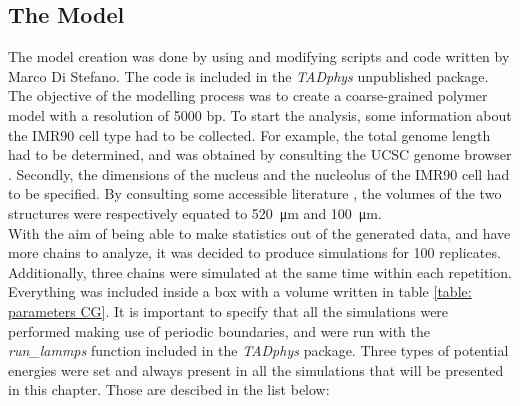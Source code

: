 
\subsection{The Model} \label{chap: the model description}
The model creation was done by using and modifying scripts and code written by Marco Di Stefano. The code is included in the \textit{TADphys} unpublished package.
The objective of the modelling process was to create a coarse-grained polymer model with a resolution of 5000 bp. To start the analysis, some information about the IMR90 cell type had to be collected. For example, the total genome length had to be determined, and was obtained by consulting the UCSC genome browser
\cite{UCSCGenomeBrowser}.
Secondly, the dimensions of the nucleus and the nucleolus of the IMR90 cell had to be specified. By consulting some accessible literature
\cite{ehlerHumanFoetalLung1996,ingramHiCImplementationGenome2020,maiserSuperresolutionSituAnalysis2020},
the volumes of the two structures were respectively equated to \SI{520}{\micro\metre} and \SI{100}{\micro\metre}.\\

With the aim of being able to make statistics out of the generated data, and have more chains to analyze, it was decided to produce simulations for 100 replicates. Additionally, three chains were simulated at the same time within each repetition. Everything was included inside a box with a volume written in table \ref{table: parameters CG}. 
It is important to specify that all the simulations were performed making use of periodic boundaries, and were run with the \textit{run\_lammps} function included in the \textit{TADphys} package.
Three types of potential energies were set and always present in all the simulations that will be presented in this chapter. Those are descibed in the list below:

